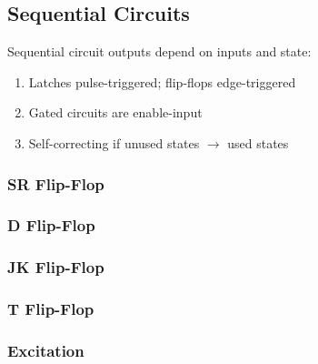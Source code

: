 \documentclass[12pt, a4paper]{article}
\begin{document}
\begin{multicols*}{3}
\section{Sequential Circuits}
Sequential circuit outputs depend on inputs and state:
\begin{enumerate}[\roman*.]
  \item Latches pulse-triggered; flip-flops edge-triggered
  \item Gated circuits are enable-input
  \item Self-correcting if unused states $\rightarrow$ used states
\end{enumerate}

\subsubsection{SR Flip-Flop}
\vspace{-1em}
\subsubsection{D Flip-Flop}
\vspace{-1em}
\subsubsection{JK Flip-Flop}
\vspace{-1em}
\subsubsection{T Flip-Flop}

\subsubsection{Excitation}
\vspace{-1em}
\colbreak

\end{multicols*}
\end{document}
